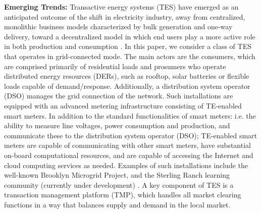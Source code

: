 \documentclass[sigplan]{acmart}
\begin{document}
\textbf{Emerging Trends:} Transactive energy systems (TES) have emerged as an anticipated outcome of the shift in electricity industry, away from centralized, monolithic business models characterized by bulk generation and one-way delivery, toward a decentralized model in which end users play a more active role in both production and consumption \cite{NIST_TE} \cite{Gridwise}. %
In this paper, we consider a class of TES that operates in grid-connected mode. The main actors are the consumers, which are comprised primarily of residential loads and prosumers who operate distributed energy resources (DERs), such as rooftop, solar batteries or flexible loads capable of demand/response. Additionally, a distribution system operator (DSO) manages the grid connection of the network. Such installations are equipped with an advanced metering infrastructure consisting of TE-enabled smart meters. In addition to the standard functionalities of smart meters: i.e. the ability to measure line voltages, power consumption and production, and communicate these to the distribution system operator (DSO); TE-enabled smart meters are capable of communicating with other smart meters, have substantial on-board computational resources, and are capable of accessing the Internet and cloud computing services as needed. Examples of such installations include the well-known Brooklyn Microgrid Project, \cite{BrooklynMicrogrid} and the Sterling Ranch learning community (currently under development) \cite{SterlingRanch}. A key component of TES is a transaction management platform (TMP), which handles all market clearing functions in a way that balances supply and demand in the local market.
\end{document}
